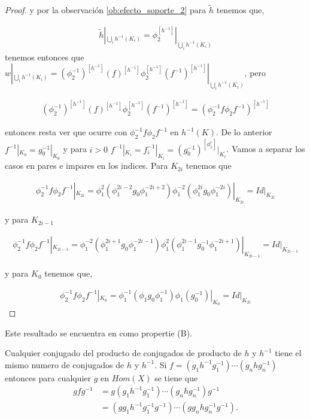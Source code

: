 \documentclass{subfiles}
\begin{document}
\begin{proof}
y por la observación \ref{ob:efecto_soporte_2}  para $\tilde{h}$ tenemos que,

\begin{align*}
\tilde{h}|_{\bigcup_i h^{-1}(K_i)}=\phi_2^{[h^{-1}]}|_{\bigcup_i h^{-1}(K_i)}
\end{align*}
tenemos entonces que $w|_{\bigcup_i h^{-1}(K_i)}= (\phi_2^{-1})^{[h^{-1}]}(f)^{[h^{-1}]}\phi_2^{[h^{-1}]}(f^{-1})^{[h^{-1}]}|_{\bigcup_i h^{-1}(K_i)}$, pero 

\begin{align*}
(\phi_2^{-1})^{[h^{-1}]}(f)^{[h^{-1}]}\phi_2^{[h^{-1}]}(f^{-1})^{[h^{-1}]}=(\phi_2^{-1} f \phi_2 f^{-1})^{[h^{-1}]}
\end{align*}

entonces resta ver que ocurre con  $\phi_2^{-1} f \phi_2 f^{-1}$ en $h^{-1}(K)$. De lo anterior $f^{-1}|_{K_0}=g_0^{-1}|_{K_0}$ y para $i>0 $ $f^{-1}|_{K_i}=f_i^{-1}|_{K_i}=(g_0^{-1})^{[\phi_1^i]}|_{K_i}$. Vamos a separar los casos en pares e impares en los indices. Para $K_{2i}$ tenemos que

\begin{align*}
\phi_2^{-1}f\phi_2f^{-1}|_{K_{2i}} = \phi_1^2(\phi_1^{2i-2}g_0\phi_1^{-2i+2})\phi_1^{-2}(\phi_1^{2i}g_0\phi_1^{-2i})|_{K_{2i}}=Id|_{K_{2i}}
\end{align*}

y para $K_{2i-1}$

\begin{align*}
\phi_2^{-1}f\phi_2f^{-1}|_{K_{2i-1}}= \phi_1^{-2}(\phi_1^{2i+1}g_0 \phi_1^{-2i-1})\phi_1^2(\phi_1^{2i-1}g_0^{-1}\phi_1^{-2i+1})|_{K_{2i-1}}=Id|_{K_{2i-1}}
\end{align*}

y para $K_0$ tenemos que,

\begin{align*}
\phi_2^{-1}f\phi_2f^{-1}|_{K_0} = \phi_1^{-1}(\phi_1 g_0 \phi_1^{-1})\phi_1(g_0^{-1})|_{K_0}=Id|_{K_{2i}}
\end{align*}

\end{proof}

Este resultado se encuentra en \cite{ander} como propertie (B).

\begin{ob}\label{ob:numero_conjugados}
Cualquier conjugado del producto de conjugados de producto de $h$ y $h^{-1}$ tiene el mismo numero de conjugados de $h$ y $h^{-1}$. Si $f=(g_1 h^{-1} g_1^{-1}) \cdots(g_n h g_n^{-1})$ entonces para cualquier $g$ en $Hom(X)$ se tiene que
\begin{align*}
g f g^{-1} & = g(g_1 h^{-1} g_1^{-1}) \cdots (g_n h g_n^{-1})g^{-1}\\
&= (gg_1 h^{-1} g_1^{-1}g^{-1})\cdots(gg_n h g_n^{-1}g^{-1}).
\end{align*} 
\end{ob}	  
 
\end{document}

